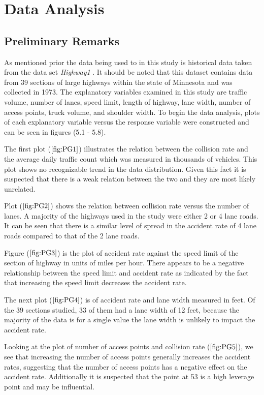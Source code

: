 \documentclass[12pt]{report}
\begin{document}
\chapter{Data Analysis}
\section{Preliminary Remarks}
As mentioned prior the data being used to in this study is historical data taken from the data set \textit{Highway1} \cite{Data}. It should be noted that this dataset contains data from 39 sections of large highways within the state of Minnesota and was collected in 1973. The explanatory variables examined in this study are traffic volume, number of lanes, speed limit, length of highway, lane width, number of access points, truck volume, and shoulder width. To begin the data analysis, plots of each explanatory variable versus the response variable were constructed and can be seen in figures (5.1 - 5.8). 

The first plot ($\ref{fig:PG1}$) illustrates the relation between the collision rate and the average daily traffic count which was measured in thousands of vehicles. This plot shows no recognizable trend in the data distribution. Given this fact it is suspected that there is a weak relation between the two and they are most likely unrelated.

Plot ($\ref{fig:PG2}$) shows the relation between collision rate versus the number of lanes. A majority of the highways used in the study were either 2 or 4 lane roads. It can be seen that there is a similar level of spread in the accident rate of 4 lane roads compared to that of the 2 lane roads. 

Figure ($\ref{fig:PG3}$) is the plot of accident rate against the speed limit of the section of highway in units of miles per hour. There appears to be a negative relationship between the speed limit and accident rate as indicated by the fact that increasing the speed limit decreases the accident rate. 

The next plot ($\ref{fig:PG4}$) is of accident rate and lane width measured in feet. Of the 39 sections studied, 33 of them had a lane width of 12 feet, because the majority of the data is for a single value the lane width is unlikely to impact the accident rate.

Looking at the plot of number of access points and collision rate ($\ref{fig:PG5}$), we see that increasing the number of access points generally increases the accident rates, suggesting that the number of access points has a negative effect on the accident rate. Additionally it is suspected that the point at 53 is a high leverage point and may be influential.  
\end{document}
